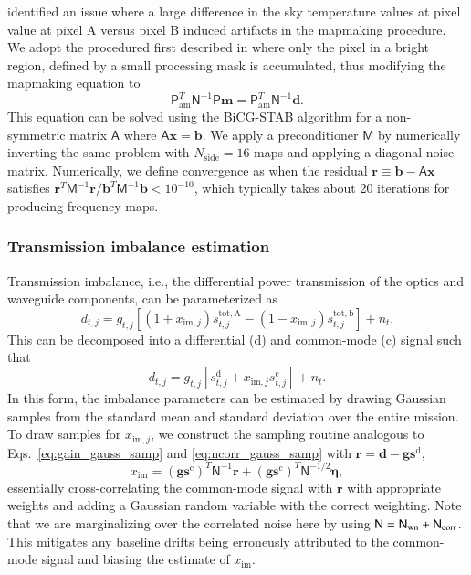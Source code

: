 \documentclass[twocolumn]{../../common/aa}
\newcommand{\N}[0]{\tens{N}}
\begin{document}
\citet{jarosik2010} identified an issue where a large difference in the sky temperature values at pixel value at pixel A versus pixel B induced artifacts in the mapmaking procedure. We adopt the procedured first described in \citet{hinshaw2003a} where only the pixel in a bright region, defined by a small processing mask \citep{bennett2012} is accumulated, thus modifying the mapmaking equation to
\begin{equation}
	\mathsf P^T_\mathrm{am}\mathsf N^{-1}\mathsf P\boldsymbol m
	=\mathsf P^T_\mathrm{am}\mathsf N^{-1}\boldsymbol d.
\end{equation}
This equation can be solved using the BiCG-STAB algorithm for a non-symmetric matrix $\mathsf A$ where $\mathsf A\boldsymbol x=\boldsymbol b$. We apply a preconditioner $\mathsf M$ by numerically inverting the same problem with $N_\mathrm{side}=16$ maps and applying a diagonal noise matrix. Numerically, we define convergence as when the residual $\boldsymbol r\equiv\boldsymbol b-\mathsf A\boldsymbol x$ satisfies $\boldsymbol r^T\mathsf M^{-1}\boldsymbol r/\boldsymbol b^T\mathsf M^{-1}\boldsymbol b<10^{-10}$, which typically takes about 20 iterations for producing frequency maps.


\subsubsection{Transmission imbalance estimation}
\label{ssec:imbalance}


Transmission imbalance, i.e., the differential power transmission of the optics and waveguide components, can be parameterized as
\begin{equation}
	d_{t,j}=g_{t,j}[(1+x_{\mathrm{im},j})s_{t,j}^\mathrm{tot,A}-(1-x_{\mathrm{im},j})s_{t,j}^\mathrm{tot,b}]+n_t.
\end{equation}
This can be decomposed into a differential (d) and common-mode (c) signal such that
\begin{equation}
	d_{t,j}=g_{t,j}[s_{t,j}^\mathrm d+x_{\mathrm{im},j}s_{t,j}^\mathrm c]+n_t.
\end{equation}
In this form, the imbalance parameters can be estimated by drawing Gaussian samples from the standard mean and standard deviation over the entire mission. To draw samples for $x_{\mathrm{im},j}$, we construct the sampling routine analogous to Eqs.~\eqref{eq:gain_gauss_samp} and \eqref{eq:ncorr_gauss_samp} with $\boldsymbol r=\boldsymbol d-\boldsymbol g\boldsymbol s^\mathrm d$,
\begin{equation}
	[(\boldsymbol g\boldsymbol s^\mathrm c)^T\mathsf N^{-1}\boldsymbol g\boldsymbol s^\mathrm c]x_\mathrm{im}
	=(\boldsymbol g\boldsymbol s^\mathrm c)^T\mathsf N^{-1}\boldsymbol r+(\boldsymbol g\boldsymbol s^\mathrm c)^T\mathsf N^{-1/2}\boldsymbol\eta,
\end{equation}
essentially cross-correlating the common-mode signal with $\boldsymbol r$ with appropriate weights and adding a Gaussian random variable with the correct weighting. Note that we are marginalizing over the correlated noise here by using $\N=\N_\mathrm{wn}+\N_\mathrm{corr}$. This mitigates any baseline drifts being erroneusly attributed to the common-mode signal and biasing the estimate of $x_\mathrm{im}$.
\end{document}

